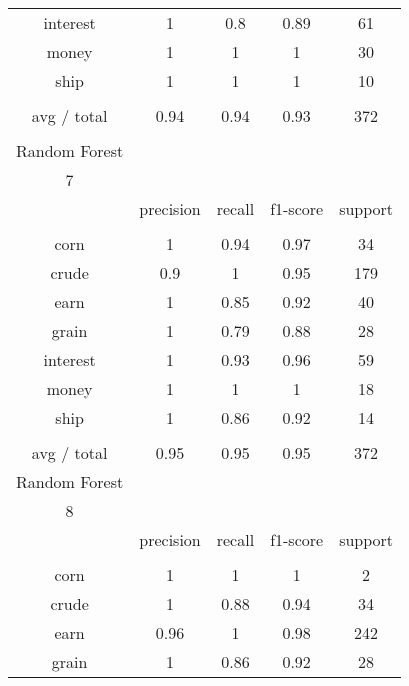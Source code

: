 \documentclass[11pt]{article}
\begin{document}
\begin{center}
\begin{longtable}{| c | c | c | c | c |}
interest      & 1         & 0.8    & 0.89     & 61      \\
money         & 1         & 1      & 1        & 30      \\
ship          & 1         & 1      & 1        & 10      \\
             &           &        &          &         \\
avg / total   & 0.94      & 0.94   & 0.93     & 372     \\
             &           &        &          &         \\
Random Forest &           &        &          &         \\
7             &           &        &          &         \\
             & precision & recall & f1-score & support \\
             &           &        &          &         \\
corn          & 1         & 0.94   & 0.97     & 34      \\
crude         & 0.9       & 1      & 0.95     & 179     \\
earn          & 1         & 0.85   & 0.92     & 40      \\
grain         & 1         & 0.79   & 0.88     & 28      \\
interest      & 1         & 0.93   & 0.96     & 59      \\
money         & 1         & 1      & 1        & 18      \\
ship          & 1         & 0.86   & 0.92     & 14      \\
             &           &        &          &         \\
avg / total   & 0.95      & 0.95   & 0.95     & 372     \\
\hline
Random Forest &           &        &          &         \\
8             &           &        &          &         \\
             & precision & recall & f1-score & support \\
             &           &        &          &         \\
corn          & 1         & 1      & 1        & 2       \\
crude         & 1         & 0.88   & 0.94     & 34      \\
earn          & 0.96      & 1      & 0.98     & 242     \\
grain         & 1         & 0.86   & 0.92     & 28      \\

\end{longtable}
\end{center}
\end{document}
